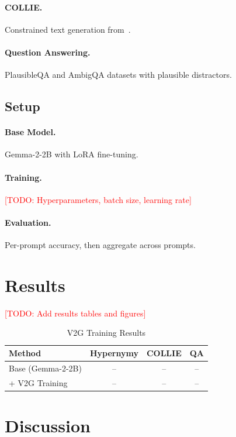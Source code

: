 \documentclass{article}
\newcommand{\todo}[1]{\textcolor{red}{[TODO: #1]}}
\begin{document}
\paragraph{COLLIE.}
Constrained text generation from~\citet{collie2024}.

\paragraph{Question Answering.}
PlausibleQA and AmbigQA datasets with plausible distractors.

\subsection{Setup}

\paragraph{Base Model.} Gemma-2-2B with LoRA fine-tuning.

\paragraph{Training.} \todo{Hyperparameters, batch size, learning rate}

\paragraph{Evaluation.} Per-prompt accuracy, then aggregate across prompts.


\section{Results}
\label{sec:results}

\todo{Add results tables and figures}

\begin{table}[h]
\centering
\caption{V2G Training Results}
\label{tab:main_results}
\begin{tabular}{lccc}
\toprule
Method & Hypernymy & COLLIE & QA \\
\midrule
Base (Gemma-2-2B) & -- & -- & -- \\
+ V2G Training & -- & -- & -- \\
\bottomrule
\end{tabular}
\end{table}


\section{Discussion}
\label{sec:discussion}
\end{document}

